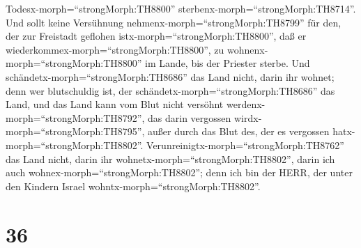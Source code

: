Todesx-morph=``strongMorph:TH8800''
sterbenx-morph=``strongMorph:TH8714''.  Und sollt keine
Versühnung nehmenx-morph=``strongMorph:TH8799'' für den, der zur
Freistadt geflohen istx-morph=``strongMorph:TH8800'', daß er
wiederkommex-morph=``strongMorph:TH8800'', zu
wohnenx-morph=``strongMorph:TH8800'' im Lande, bis der Priester sterbe.
 Und schändetx-morph=``strongMorph:TH8686'' das Land nicht,
darin ihr wohnet; denn wer blutschuldig ist, der
schändetx-morph=``strongMorph:TH8686'' das Land, und das Land kann vom
Blut nicht versöhnt werdenx-morph=``strongMorph:TH8792'', das darin
vergossen wirdx-morph=``strongMorph:TH8795'', außer durch das Blut des,
der es vergossen hatx-morph=``strongMorph:TH8802''. 
Verunreinigtx-morph=``strongMorph:TH8762'' das Land nicht, darin ihr
wohnetx-morph=``strongMorph:TH8802'', darin ich auch
wohnex-morph=``strongMorph:TH8802''; denn ich bin der HERR, der unter
den Kindern Israel wohntx-morph=``strongMorph:TH8802''.

\hypertarget{section-35}{%
\section{36}\label{section-35}}

